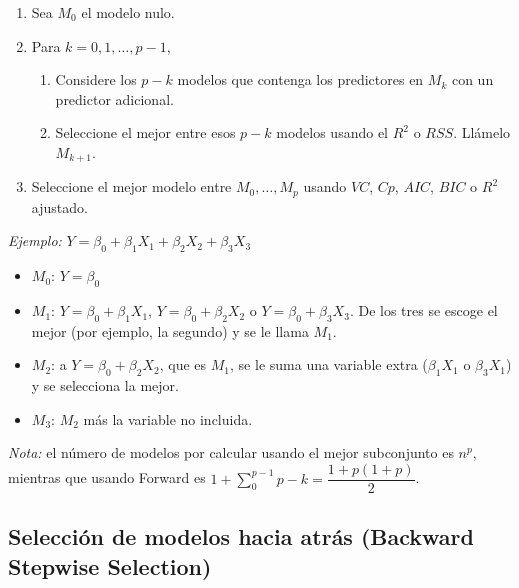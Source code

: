 \documentclass[
  12pt,
]{book}
\providecommand{\tightlist}{%
  \setlength{\itemsep}{0pt}\setlength{\parskip}{0pt}}
\theoremstyle{definition}
\theoremstyle{definition}
\theoremstyle{definition}
\theoremstyle{remark}
\begin{document}
\begin{enumerate}
\def\labelenumi{\arabic{enumi}.}
\tightlist
\item
  Sea \(M_0\) el modelo nulo.
\item
  Para \(k=0,1,\dots,p-1\),

  \begin{enumerate}
  \def\labelenumii{\alph{enumii}.}
  \tightlist
  \item
    Considere los \(p-k\) modelos que contenga los predictores en \(M_k\) con un predictor adicional.
  \item
    Seleccione el mejor entre esos \(p-k\) modelos usando el \(R^2\) o \(RSS\). Llámelo \(M_{k+1}\).
  \end{enumerate}
\item
  Seleccione el mejor modelo entre \(M_0,\dots, M_p\) usando \(VC\), \(Cp\), \(AIC\), \(BIC\) o \(R^2\) ajustado.
\end{enumerate}

\emph{Ejemplo:} \(Y=\beta_0+\beta_1X_1+\beta_2X_2+\beta_3X_3\)

\begin{itemize}
\item
  \(M_0\): \(Y = \beta_0\)
\item
  \(M_1\): \(Y = \beta_0+\beta_1X_1\), \(Y = \beta_0+\beta_2X_2\) o \(Y = \beta_0+\beta_3X_3\). De los tres se escoge el mejor (por ejemplo, la segundo) y se le llama \(M_1\).
\item
  \(M_2\): a \(Y = \beta_0+\beta_2X_2\), que es \(M_1\), se le suma una variable extra (\(\beta_1X_1\) o \(\beta_3X_1\)) y se selecciona la mejor.
\item
  \(M_3\): \(M_2\) más la variable no incluida.
\end{itemize}

\emph{Nota:} el número de modelos por calcular usando el mejor subconjunto es \(n^p\), mientras que usando Forward es \(1+\displaystyle\sum_0^ {p-1} p-k = \dfrac{1+p(1+p)}2\).

\hypertarget{selecciuxf3n-de-modelos-hacia-atruxe1s-backward-stepwise-selection}{%
\subsection{\texorpdfstring{Selección de modelos hacia atrás (\textbf{Backward Stepwise Selection})}{Selección de modelos hacia atrás (Backward Stepwise Selection)}}\label{selecciuxf3n-de-modelos-hacia-atruxe1s-backward-stepwise-selection}}
\end{document}
